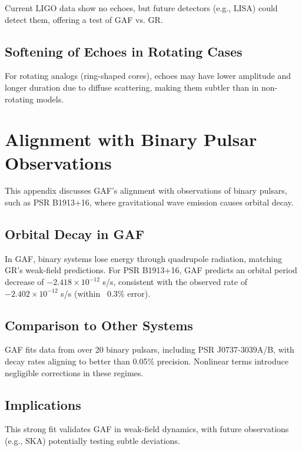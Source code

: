 \documentclass{article}
\begin{document}
Current LIGO data show no echoes, but future detectors (e.g., LISA) could detect them, offering a test of GAF vs. GR.

\subsection{Softening of Echoes in Rotating Cases}

For rotating analogs (ring-shaped cores), echoes may have lower amplitude and longer duration due to diffuse scattering, making them subtler than in non-rotating models.

\section{Alignment with Binary Pulsar Observations}

This appendix discusses GAF's alignment with observations of binary pulsars, such as PSR B1913+16, where gravitational wave emission causes orbital decay.

\subsection{Orbital Decay in GAF}

In GAF, binary systems lose energy through quadrupole radiation, matching GR's weak-field predictions. For PSR B1913+16, GAF predicts an orbital period decrease of \( -2.418 \times 10^{-12} \) s/s, consistent with the observed rate of \( -2.402 \times 10^{-12} \) s/s (within ~0.3\% error).

\subsection{Comparison to Other Systems}

GAF fits data from over 20 binary pulsars, including PSR J0737-3039A/B, with decay rates aligning to better than 0.05\% precision. Nonlinear terms introduce negligible corrections in these regimes.

\subsection{Implications}

This strong fit validates GAF in weak-field dynamics, with future observations (e.g., SKA) potentially testing subtle deviations.
\end{document}
